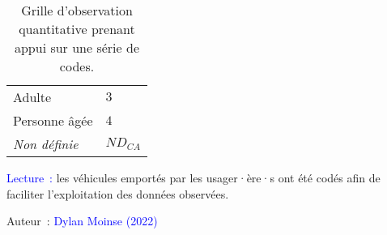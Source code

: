 \begin{table}[h!]
{\begin{tabular}{p{}p{}}
    \small{Adulte} & \small{\(3\)}\\
    \small{Personne âgée} & \small{\(4\)}\\
        \hdashline
    \small{\textsl{Non définie}} & \small{\(ND_{CA}\)}\\        
        \hline
  \end{tabular}}
    \caption{Grille d'observation quantitative prenant appui sur une série de codes.}
    \label{table-chap3:code-observation-quantitative}
    \vspace{5pt}
    \begin{flushleft}\scriptsize{
    \textcolor{blue}{Lecture~:} les véhicules emportés par les usager·ère·s ont été codés afin de faciliter l'exploitation des données observées.
    }\end{flushleft}
    \begin{flushright}\scriptsize{
    Auteur~: \textcolor{blue}{Dylan Moinse (2022)}
    }\end{flushright}
  \end{table}